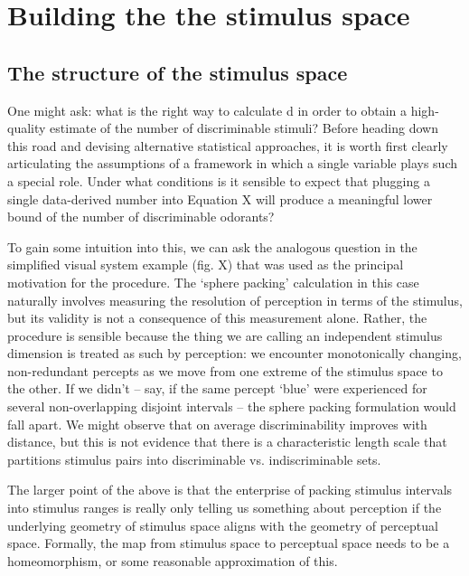 \documentclass[letterpaper,twocolumn,10pt]{article}
\begin{document}
\section{Building the the stimulus space}
\label{correlations}
\subsection{The structure of the stimulus space}
One might ask: what is the right way to calculate d in order to obtain a high-quality estimate of the number of discriminable stimuli? Before heading down this road and devising alternative statistical approaches, it is worth first clearly articulating the assumptions of a framework in which a single variable plays such a special role. Under what conditions is it sensible to expect that plugging a single data-derived number into Equation X will produce a meaningful lower bound of the number of discriminable odorants?

To gain some intuition into this, we can ask the analogous question in the simplified visual system example (fig. X) that was used as the principal motivation for the procedure. The ‘sphere packing’ calculation in this case naturally involves measuring the resolution of perception in terms of the stimulus, but its validity is not a consequence of this measurement alone. Rather, the procedure is sensible because the thing we are calling an independent stimulus dimension is treated as such by perception: we encounter monotonically changing, non-redundant percepts as we move from one extreme of the stimulus space to the other. If we didn’t -- say, if the same percept ‘blue’ were experienced for several non-overlapping disjoint intervals -- the sphere packing formulation would fall apart. We might observe that on average discriminability improves with distance, but this is not evidence that there is a characteristic length scale that partitions stimulus pairs into discriminable vs. indiscriminable sets.

The larger point of the above is that the enterprise of packing stimulus intervals into stimulus ranges is really only telling us something about perception if the underlying geometry of stimulus space aligns with the geometry of perceptual space. Formally, the map from stimulus space to perceptual space needs to be a homeomorphism, or some reasonable approximation of this. 
\end{document}
